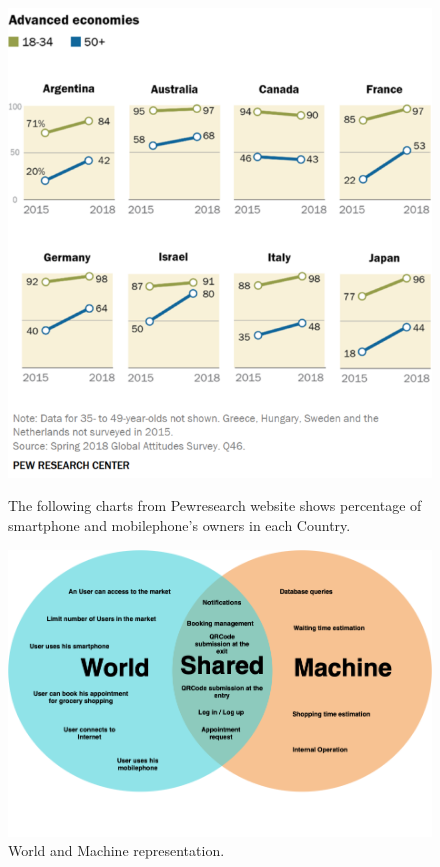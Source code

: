 \begin{figure}[H]
  {\includegraphics[scale=0.55]{images/statistics_smartphone2.png}\label{fig:f2}}
  \caption{The following charts from Pewresearch website shows percentage of smartphone and mobilephone's owners in each Country.}
\end{figure}

\begin{figure}[H]
  \caption{World and Machine representation.}
  \centering
  \includegraphics[scale = 0.38]{diagrams/VENN.png}
\end{figure}
\par
